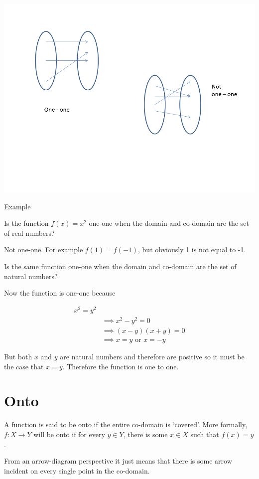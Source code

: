 \documentclass[12pt]{article}
\begin{document}
\includegraphics[scale=0.6]{./img/oneone.png}

Example

Is the function $f(x) = x^2$ one-one when the domain and co-domain are the set of real numbers?

Not one-one. For example $f(1) =  f(-1)$, but obviously 1 is not equal to -1.

Is the same function one-one when the domain and co-domain are the set of natural numbers?

Now the function is one-one because 

\begin{align*}
x^2 = y^2 \\
& \implies x^2 - y^2 = 0 \\
& \implies (x - y) (x + y) = 0\\
& \implies x = y \text{ or }  x = -y
\end{align*}

But both $x$ and $y$ are natural numbers and therefore are positive so it must be the case that $x = y$. Therefore the function is one to one.

\section*{Onto}
A function is said to be onto if the entire co-domain is `covered'. More formally, $f:X \rightarrow Y$ will be onto if for every $y \in Y$, there is some $x \in X$ such that $f(x) = y$. 

From an arrow-diagram perspective it just means that there is some arrow incident on every single point in the co-domain.
\end{document}
